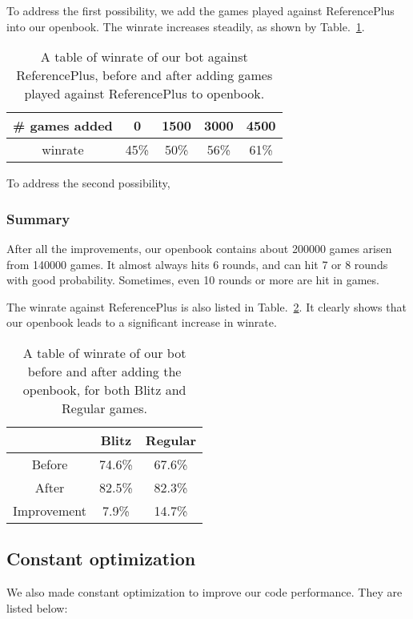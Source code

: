 \documentclass[10pt,twosidep]{article}
\begin{document}
To address the first possibility, we add the games played against ReferencePlus into our openbook. The winrate increases steadily, as shown by Table.~\ref{tbl:openbook_rf}. 

\begin{table}[h]
\centering
\begin{tabular}{|c|c|c|c|c|}
\hline
\# games added & 0 & 1500 & 3000 & 4500 \\
\hline
winrate & 45\% & 50\% & 56\% & 61\% \\
\hline
\end{tabular} 
\caption{A table of winrate of our bot against ReferencePlus, before and after adding games played against ReferencePlus to openbook. } 
\label{tbl:openbook_rf}
\end{table}

To address the second possibility, 

\subsubsection{Summary}
After all the improvements, our openbook contains about 200000 games arisen from 140000 games. It almost always hits 6 rounds, and can hit 7 or 8 rounds with good probability. Sometimes, even 10 rounds or more are hit in games. 

The winrate against ReferencePlus is also listed in Table.~\ref{tbl:openbook_final}. It clearly shows that our openbook leads to a significant increase in winrate. 

\begin{table}[h]
\centering
\begin{tabular}{|c|c|c|}
\hline
    & Blitz & Regular \\
\hline
Before  & 74.6\%    & 67.6\%\\
\hline
After   & 82.5\%    & 82.3\%\\
\hline
Improvement   & 7.9\%    & 14.7\%\\
\hline
\end{tabular}
\caption{A table of winrate of our bot before and after adding the openbook, for both Blitz and Regular games. }
\label{tbl:openbook_final}
\end{table}


\subsection{Constant optimization}
We also made constant optimization to improve our code performance. They are listed below: 
\end{document}
